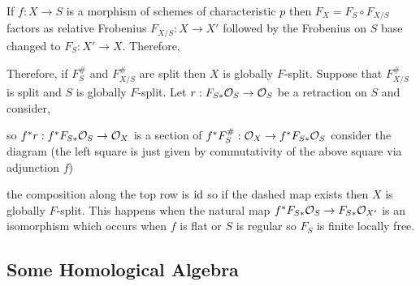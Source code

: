 \documentclass[12pt]{article}
\begin{document}
\begin{rmk}
If $f : X \to S$ is a morphism of schemes of characteristic $p$ then $F_X = F_S \circ F_{X/S}$ factors as relative Frobenius $F_{X/S} : X \to X'$ followed by the Frobenius on $S$ base changed to $F_S : X' \to X$. Therefore, 
\begin{center}
\end{center} 
Therefore, if $F_S^{\#}$ and $F_{X/S}^{\#}$ are split then $X$ is globally $F$-split. Suppose that $F_{X/S}^{\#}$ is split and $S$ is globally $F$-split. Let $r : F_{S*} \mathcal{O}_{S} \to \mathcal{O}_{S}$ be a retraction on $S$ and consider,
\begin{center}
\end{center}
so $f^* r : f^* F_{S*} \mathcal{O}_{S} \to \mathcal{O}_{X}$ is a section of $f^* F_S^{\#} : \mathcal{O}_{X} \to f^* F_{S*} \mathcal{O}_{S}$ consider the diagram (the left square is just given by commutativity of the above square via adjunction $f$)

\begin{center}
\end{center}
the composition along the top row is $\mathrm{id}$ so if the dashed map exists then $X$ is globally $F$-split. This happens when the natural map $f^* F_{S*} \mathcal{O}_{S} \to F_{S*} \mathcal{O}_{X'}$ is an isomorphism which occurs when $f$ is flat or $S$ is regular so $F_S$ is finite locally free. 
\end{rmk}

\subsection{Some Homological Algebra}
\end{document}
